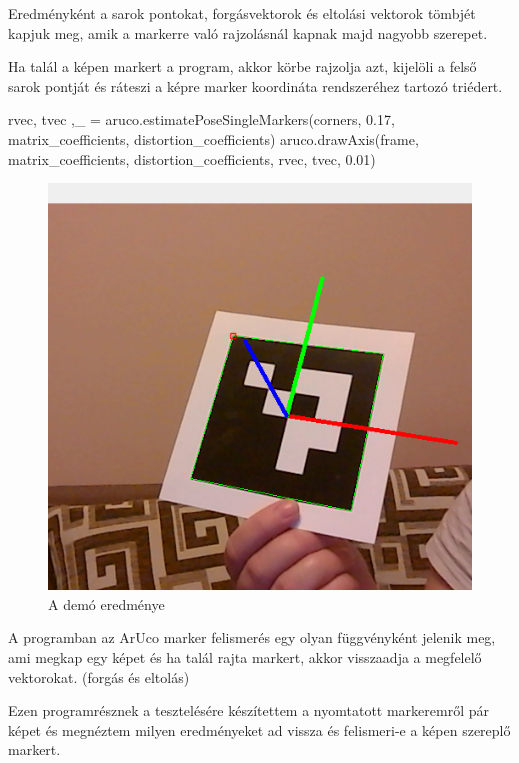 Eredményként a sarok pontokat, forgásvektorok és eltolási vektorok tömbjét kapjuk meg, amik a markerre való rajzolásnál kapnak majd nagyobb szerepet.

Ha talál a képen markert a program, akkor körbe rajzolja azt, kijelöli a felső sarok pontját és ráteszi a képre marker koordináta rendszeréhez tartozó triédert.\\

\begin{python}
rvec, tvec ,_ = aruco.estimatePoseSingleMarkers(corners,
0.17, matrix_coefficients, distortion_coefficients)       
aruco.drawAxis(frame, matrix_coefficients, distortion_coefficients, 
rvec, tvec, 0.01)
\end{python}
\begin{figure}[htp]
    \centering
   	\includegraphics[width=4truecm, height=2.8truecm]{images/felismeres_aruco.png}
	\caption{A demó eredménye}
\end{figure}


A programban az ArUco marker felismerés egy olyan függvényként jelenik meg, ami megkap egy képet és ha talál rajta markert, akkor visszaadja a megfelelő vektorokat. (forgás és eltolás)

Ezen programrésznek a tesztelésére készítettem a nyomtatott markeremről pár képet és megnéztem milyen eredményeket ad vissza és felismeri-e a képen szereplő markert.

